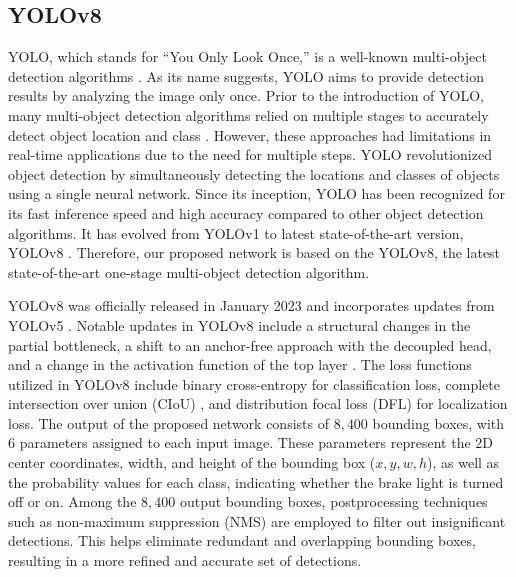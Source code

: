 \subsection{YOLOv8}
YOLO, which stands for ``You Only Look Once,'' is a well-known multi-object detection algorithms \cite{redmon2016you}.
As its name suggests, YOLO aims to provide detection results by analyzing the image only once. 
Prior to the introduction of YOLO, many multi-object detection algorithms relied on multiple stages to accurately detect object location and class \cite{girshick2014rich, he2015spatial, girshick2015fast, ren2015faster}.
However, these approaches had limitations in real-time applications due to the need for multiple steps.
YOLO revolutionized object detection by simultaneously detecting the locations and classes of objects using a single neural network.
Since its inception, YOLO has been recognized for its fast inference speed and high accuracy compared to other object detection algorithms.
It has evolved from YOLOv1 to latest state-of-the-art version, YOLOv8 \cite{redmon2016you, redmon2017yolo9000, redmon2018yolov3, bochkovskiy2020yolov4, YOLOv5, li2022yolov6, wang2023yolov7, YOLOv8}.
Therefore, our proposed network is based on the YOLOv8, the latest state-of-the-art one-stage multi-object detection algorithm.

YOLOv8 \cite{YOLOv8} was officially released in January 2023 and incorporates updates from YOLOv5 \cite{YOLOv5}.
Notable updates in YOLOv8 include a structural changes in the partial bottleneck, a shift to an anchor-free approach with the decoupled head, and a change in the activation function of the top layer \cite{terven2023comprehensive}.
The loss functions utilized in YOLOv8 include binary cross-entropy for classification loss, complete intersection over union (CIoU) \cite{zheng2020distance}, and distribution focal loss (DFL) \cite{li2020generalized} for localization loss.
The output of the proposed network consists of $8,400$ bounding boxes, with $6$ parameters assigned to each input image.
These parameters represent the 2D center coordinates, width, and height of the bounding box ($x, y, w, h$), as well as the probability values for each class, indicating whether the brake light is turned off or on. 
Among the $8,400$ output bounding boxes, postprocessing techniques such as non-maximum suppression (NMS) are employed to filter out insignificant detections.
This helps eliminate redundant and overlapping bounding boxes, resulting in a more refined and accurate set of detections.

